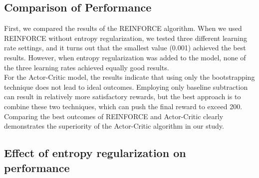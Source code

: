 \documentclass{article}
\begin{document}
\subsection{Comparison of Performance}
First, we compared the results of the REINFORCE algorithm. When we used REINFORCE without entropy regularization, we tested three different learning rate settings, and it turns out that the smallest value (0.001) achieved the best results. However, when entropy regularization was added to the model, none of the three learning rates achieved equally good results.\\
For the Actor-Critic model, the results indicate that using only the bootstrapping technique does not lead to ideal outcomes. Employing only baseline subtraction can result in relatively more satisfactory rewards, but the best approach is to combine these two techniques, which can push the final reward to exceed 200.\\
Comparing the best outcomes of REINFORCE and Actor-Critic clearly demonstrates the superiority of the Actor-Critic algorithm in our study.\\







\subsection{Effect of entropy regularization on performance}



\end{document}
